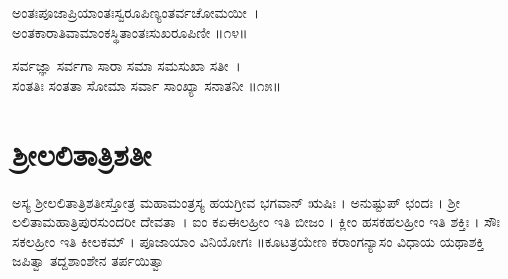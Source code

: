 ಅಂತಃಪೂಜಾಪ್ರಿಯಾಂತಃಸ್ವರೂಪಿಣ್ಯಂತರ್ವಚೋಮಯೀ~।\\
ಅಂತಕಾರಾತಿವಾಮಾಂಕಸ್ಥಿತಾಂತಃಸುಖರೂಪಿಣೀ ॥೧೪॥

ಸರ್ವಜ್ಞಾ ಸರ್ವಗಾ ಸಾರಾ ಸಮಾ ಸಮಸುಖಾ ಸತೀ~।\\
ಸಂತತಿಃ ಸಂತತಾ ಸೋಮಾ ಸರ್ವಾ ಸಾಂಖ್ಯಾ ಸನಾತನೀ ॥೧೫॥
\section{ಶ್ರೀಲಲಿತಾತ್ರಿಶತೀ}
ಅಸ್ಯ ಶ್ರೀಲಲಿತಾತ್ರಿಶತೀಸ್ತೋತ್ರ ಮಹಾಮಂತ್ರಸ್ಯ ಹಯಗ್ರೀವ ಭಗವಾನ್ ಋಷಿಃ । ಅನುಷ್ಟುಪ್ ಛಂದಃ । ಶ್ರೀ ಲಲಿತಾಮಹಾತ್ರಿಪುರಸುಂದರೀ ದೇವತಾ~। ಐಂ ಕಏಈಲಹ್ರೀಂ ಇತಿ ಬೀಜಂ । ಕ್ಲೀಂ ಹಸಕಹಲಹ್ರೀಂ ಇತಿ ಶಕ್ತಿಃ । ಸೌಃ ಸಕಲಹ್ರೀಂ ಇತಿ ಕೀಲಕಮ್ । ಪೂಜಾಯಾಂ ವಿನಿಯೋಗಃ ॥ಕೂಟತ್ರಯೇಣ ಕರಾಂಗನ್ಯಾಸಂ ವಿಧಾಯ ಯಥಾಶಕ್ತಿ ಜಪಿತ್ವಾ ತದ್ದಶಾಂಶೇನ ತರ್ಪಯಿತ್ವಾ\\
